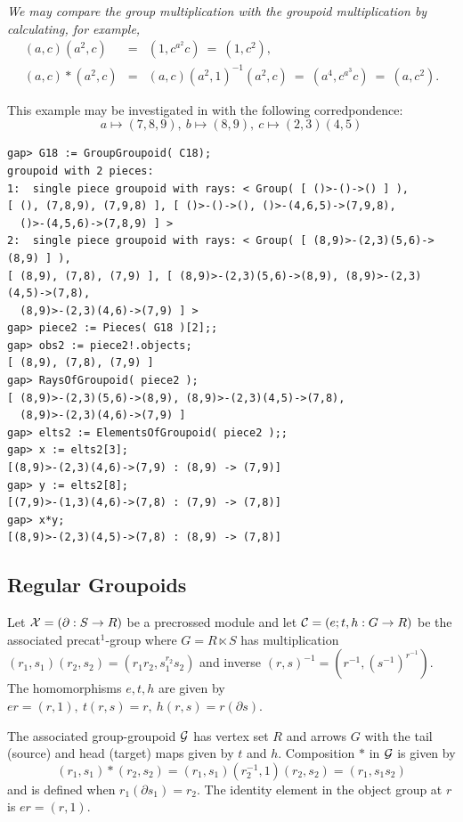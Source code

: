 \begin{example}
\noindent
\emph{We may compare the group multiplication with the groupoid multiplication
by calculating, for example,}
\begin{eqnarray*}
(a,c)(a^2,c) &=& (1,c^{a^2}c) ~=~ (1,c^2), \\
(a,c)*(a^2,c)     &=& (a,c)(a^2,1)^{-1}(a^2,c) ~=~ (a^4,c^{a^3}c) ~=~ (a,c^2).
\end{eqnarray*}
\end{example}

\begin{example} \label{ex:G18}
This example may be investigated in {\GAP} with the following corredpondence:
$$
a \mapsto (7,8,9),~ b \mapsto (8,9),~ c \mapsto (2,3)(4,5)
$$

{\small 
\begin{verbatim}
gap> G18 := GroupGroupoid( C18);
groupoid with 2 pieces:
1:  single piece groupoid with rays: < Group( [ ()>-()->() ] ), 
[ (), (7,8,9), (7,9,8) ], [ ()>-()->(), ()>-(4,6,5)->(7,9,8), 
  ()>-(4,5,6)->(7,8,9) ] >
2:  single piece groupoid with rays: < Group( [ (8,9)>-(2,3)(5,6)->(8,9) ] ), 
[ (8,9), (7,8), (7,9) ], [ (8,9)>-(2,3)(5,6)->(8,9), (8,9)>-(2,3)(4,5)->(7,8),
  (8,9)>-(2,3)(4,6)->(7,9) ] >
gap> piece2 := Pieces( G18 )[2];;
gap> obs2 := piece2!.objects;
[ (8,9), (7,8), (7,9) ]
gap> RaysOfGroupoid( piece2 );
[ (8,9)>-(2,3)(5,6)->(8,9), (8,9)>-(2,3)(4,5)->(7,8), 
  (8,9)>-(2,3)(4,6)->(7,9) ]
gap> elts2 := ElementsOfGroupoid( piece2 );;
gap> x := elts2[3];
[(8,9)>-(2,3)(4,6)->(7,9) : (8,9) -> (7,9)]
gap> y := elts2[8];
[(7,9)>-(1,3)(4,6)->(7,8) : (7,9) -> (7,8)]
gap> x*y;
[(8,9)>-(2,3)(4,5)->(7,8) : (8,9) -> (7,8)]
\end{verbatim}} 
\end{example} 


\newpage
\subsection{Regular Groupoids} \label{subs:reggpd}  

Let $\mathcal{X} = (\partial : S \to R)$ be a precrossed module and let 
$\mathcal{C} = (e;t,h : G \to R)$ be the associated precat$^1$-group 
where $G = R \ltimes S$ 
has multiplication $(r_1,s_1)(r_2,s_2) = (r_1r_2,s_1^{r_2}s_2)$ 
and inverse $(r,s)^{-1} = (r^{-1},(s^{-1})^{r^{-1}})$. 
The homomorphisms $e,t,h$ are given by 
$er = (r,1),~ t(r,s) = r,~ h(r,s) = r(\partial s)$. 

The associated group-groupoid $\mathcal{G}$ has vertex set $R$ and arrows $G$ 
with the tail (source) and head (target) maps given by $t$ and $h$. 
Composition $*$ in $\mathcal{G}$ is given by 
$$
(r_1,s_1) * (r_2,s_2) = (r_1,s_1)(r_2^{-1},1)(r_2,s_2) = (r_1,s_1s_2) 
$$ 
and is defined when $r_1(\partial s_1) = r_2$. 
The identity element in the object group at $r$ is $er = (r,1)$. 

